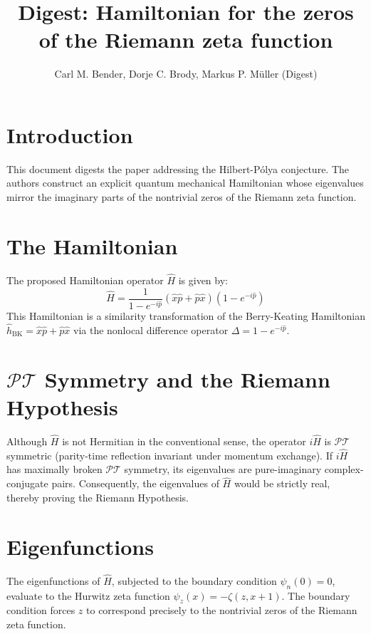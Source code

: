\documentclass{article}
\begin{document}
\title{Digest: Hamiltonian for the zeros of the Riemann zeta function}
\author{Carl M. Bender, Dorje C. Brody, Markus P. M\"uller (Digest)}
\maketitle

\section{Introduction}
This document digests the paper addressing the Hilbert-P\'olya conjecture. The authors construct an explicit quantum mechanical Hamiltonian whose eigenvalues mirror the imaginary parts of the nontrivial zeros of the Riemann zeta function.

\section{The Hamiltonian}
The proposed Hamiltonian operator $\hat{H}$ is given by:
\begin{equation}
\hat{H} = \frac{1}{1 - e^{-i\hat{p}}} (\hat{x}\hat{p} + \hat{p}\hat{x}) (1 - e^{-i\hat{p}})
\end{equation}
This Hamiltonian is a similarity transformation of the Berry-Keating Hamiltonian $\hat{h}_{\text{BK}} = \hat{x}\hat{p} + \hat{p}\hat{x}$ via the nonlocal difference operator $\Delta = 1 - e^{-i\hat{p}}$.

\section{$\mathcal{PT}$ Symmetry and the Riemann Hypothesis}
Although $\hat{H}$ is not Hermitian in the conventional sense, the operator $i\hat{H}$ is $\mathcal{PT}$ symmetric (parity-time reflection invariant under momentum exchange). If $i\hat{H}$ has maximally broken $\mathcal{PT}$ symmetry, its eigenvalues are pure-imaginary complex-conjugate pairs. Consequently, the eigenvalues of $\hat{H}$ would be strictly real, thereby proving the Riemann Hypothesis.

\section{Eigenfunctions}
The eigenfunctions of $\hat{H}$, subjected to the boundary condition $\psi_n(0) = 0$, evaluate to the Hurwitz zeta function $\psi_z(x) = -\zeta(z, x+1)$. The boundary condition forces $z$ to correspond precisely to the nontrivial zeros of the Riemann zeta function.
\end{document}
